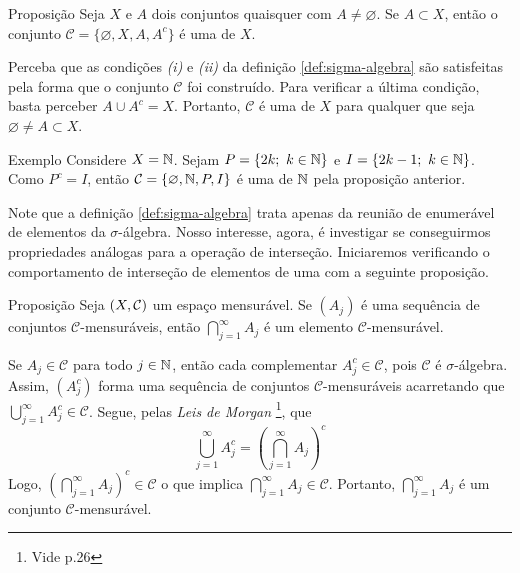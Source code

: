
\begin{resultado}{Proposição}
\label{prop:sigma-complementar}
    Seja $X$ e $A$ dois conjuntos quaisquer com $A \neq \varnothing$.
    Se $A \subset X$, então o conjunto 
    $\mathcal{C}=\{\varnothing, X, A, A^c\}$ é uma \sigal de $X$.
\end{resultado}

\begin{prova}
    Perceba que as condições \textit{(i)} e \textit{(ii)} da definição \ref{def:sigma-algebra} são satisfeitas pela forma que o conjunto  $\mathcal{C}$ foi construído. Para verificar a última condição, basta perceber $A \cup A^c = X$. Portanto, $\mathcal{C}$ é uma \sigal de $X$ para qualquer que seja $ \varnothing \neq A \subset X$.
\end{prova}

\begin{resultado}{Exemplo}
    Considere $X = \operatorname{\mathbb{N}}$. 
    Sejam $P =\{2k; \ k \in \operatorname{\mathbb{N}}\}$ e $I = \{2k - 1;\ k \in \operatorname{\mathbb{N}}\}$. 
    Como $P^c = I$, então $\mathcal{C} = \{\varnothing, \operatorname{\mathbb{N}}, P, I\}$ é uma \sigal de $\operatorname{\mathbb{N}}$ pela proposição anterior.
\end{resultado}
 
Note que a definição \ref{def:sigma-algebra} trata apenas da reunião de enumerável de elementos da $\sigma$-álgebra. 
Nosso interesse, agora, é investigar se conseguirmos propriedades análogas para a operação de interseção. 
Iniciaremos verificando o comportamento de interseção de elementos de uma \sigal com a seguinte proposição.

\begin{resultado}{Proposição}
\label{prop:interseção-elementos-sigmas}
    Seja $(X, \operatorname{\mathcal{C}})$ um espaço mensurável.
    Se $(A_j)$ é uma sequência  de conjuntos $\mathcal{C} $-mensuráveis, então $\displaystyle \bigcap_{j = 1}^\infty A_j$ é um elemento $\mathcal{C}$-mensurável.
\end{resultado}
\begin{prova}
    Se $A_j \in \mathcal{C}$ para todo $j \in \operatorname{\mathbb{N}}$, então cada complementar $A_j^c \in \mathcal{C}$, pois $\mathcal{C}$ é $\sigma$-álgebra. 
    Assim, $(A_j^c)$ forma uma sequência de conjuntos $\mathcal{C}$-mensuráveis acarretando que 
    $\displaystyle \bigcup_{j = 1}^\infty A_j^c \in \mathcal{C}$. 
    Segue, pelas \textit{Leis de Morgan}
    \footnote{Vide \supercite{elon}{p.26}}, que 
    $$
    \displaystyle \bigcup_{j = 1}^\infty A_j^c 
    = \left(\displaystyle \bigcap_{j = 1}^\infty A_j\right)^c
  	$$
	Logo, $\left(\displaystyle \bigcap_{j = 1}^\infty A_j\right)^c \in \mathcal{C}$ o que implica $\displaystyle \bigcap_{j = 1}^\infty A_j \in \mathcal{C}$. 
	Portanto, $\displaystyle \bigcap_{j = 1}^\infty A_j$ é um conjunto $\mathcal{C}$-mensurável.
\end{prova}


